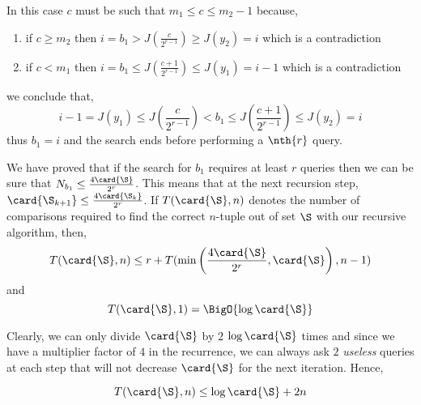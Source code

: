 In this case $c$ must be such that $m_1 \le c \le m_2 - 1$ because,
\begin{enumerate}
\item if $c \ge m_2$ then $i = b_1 > J(\frac{c}{2^{r-1}}) \ge J(y_2) = i$
which is a contradiction
\item if $c < m_1$ then $i = b_1 \le J(\frac{c+1}{2^{r-1}}) \le J(y_1) = i - 1$
which is a contradiction
\end{enumerate}
we conclude that,
$$i-1 = J(y_1) \le J\left(\frac{c}{2^{r-1}}\right) < b_1 \le
J\left(\frac{c+1}{2^{r-1}}\right) \le J(y_2) = i$$
thus $b_1 = i$ and the search ends before performing a $\nth{r}$ query.

We have proved that if the search for $b_1$ requires at least $r$ queries then
we can be sure that $N_{b_1} \le \frac{4\card{\S}}{2^r}$. This means that at
the next recursion step, $\card{\S_{k+1}} \le \frac{4\card{\S_k}}{2^r}$. If
$T(\card{\S}, n)$ denotes the number of comparisons required to find the
correct $n$-tuple out of set $\S$ with our recursive algorithm, then,
$$T(\card{\S}, n) \le r + T(\min\left(\frac{4\card{\S}}{2^r}, \card{\S}\right), n-1)$$
and
$$T(\card{\S}, 1) = \BigO{\log \card{\S}}$$

Clearly, we can only divide $\card{\S}$ by $2$ $\log \card{\S}$ times and
since we have a multiplier factor of $4$ in the recurrence, we can always ask
$2$ \emph{useless} queries at each step that will not decrease $\card{\S}$ for the
next iteration. Hence,

$$T(\card{\S}, n) \le \log \card{\S} + 2n$$
